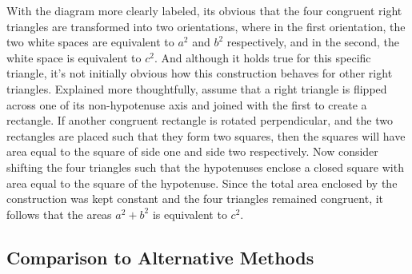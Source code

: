 \documentclass[11pt,a4paper]{article}
\begin{document}
With the diagram more clearly labeled, its obvious that the four congruent right triangles are transformed into two orientations, where in the first orientation, the two white spaces are equivalent to $a^2$ and $b^2$ respectively, and in the second, the white space is equivalent to $c^2$. And although it holds true for this specific triangle, it's not initially obvious how this construction behaves for other right triangles. Explained more thoughtfully, assume that a right triangle is flipped across one of its non-hypotenuse axis and joined with the first to create a rectangle. If another congruent rectangle is rotated perpendicular, and the two rectangles are placed such that they form two squares, then the squares will have area equal to the square of side one and side two respectively. Now consider shifting the four triangles such that the hypotenuses enclose a closed square with area equal to the square of the hypotenuse. Since the total area enclosed by the construction was kept constant and the four triangles remained congruent, it follows that the areas $a^2 +b^2$ is equivalent to $c^2$.
\pagebreak
\subsection{Comparison to Alternative Methods}
\end{document}
